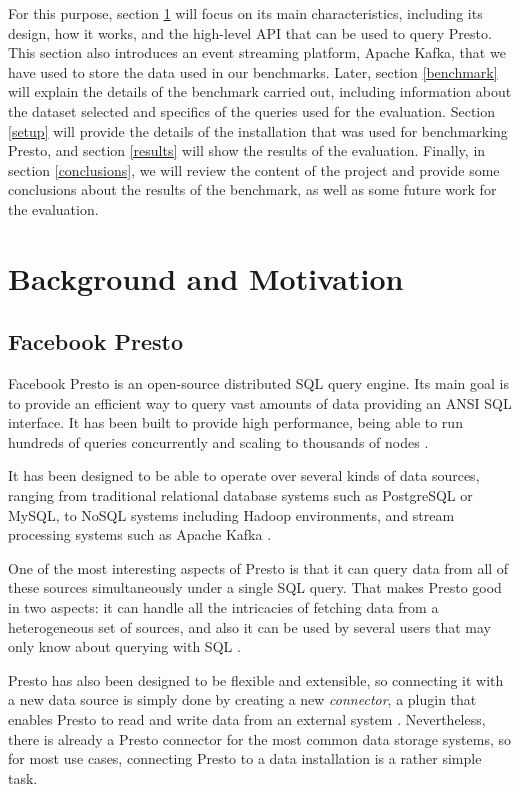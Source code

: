 \documentclass[conference]{IEEEtran}
\begin{document}
For this purpose, section \ref{background} will focus on its main characteristics, including its design, how it works, and the high-level API that can be used to query Presto. This section also introduces an event streaming platform, Apache Kafka, that we have used to store the data used in our benchmarks. Later, section \ref{benchmark} will explain the details of the benchmark carried out, including information about the dataset selected and specifics of the queries used for the evaluation. Section \ref{setup} will provide the details of the installation that was used for benchmarking Presto, and section \ref{results} will show the results of the evaluation. Finally, in section \ref{conclusions}, we will review the content of the project and provide some conclusions about the results of the benchmark, as well as some future work for the evaluation.

\section{Background and Motivation}\label{background}
\subsection{Facebook Presto}
Facebook Presto is an open-source distributed SQL query engine. Its main goal is to provide an efficient way to query vast amounts of data providing an ANSI SQL interface. It has been built to provide high performance, being able to run hundreds of queries concurrently and scaling to thousands of nodes \cite{sethi-2019}.

It has been designed to be able to operate over several kinds of data sources, ranging from traditional relational database systems such as PostgreSQL or MySQL, to NoSQL systems including Hadoop environments, and stream processing systems such as Apache Kafka \cite{facebook-presto-no-date}.

One of the most interesting aspects of Presto is that it can query data from all of these sources simultaneously under a single SQL query. That makes Presto good in two aspects: it can handle all the intricacies of fetching data from a heterogeneous set of sources, and also it can be used by several users that may only know about querying with SQL \cite{sethi-2019}.

Presto has also been designed to be flexible and extensible, so connecting it with a new data source is simply done by creating a new \textit{connector}, a plugin that enables Presto to read and write data from an external system \cite{bharathan-2022}. Nevertheless, there is already a Presto connector for the most common data storage systems, so for most use cases, connecting Presto to a data installation is a rather simple task.
\end{document}
